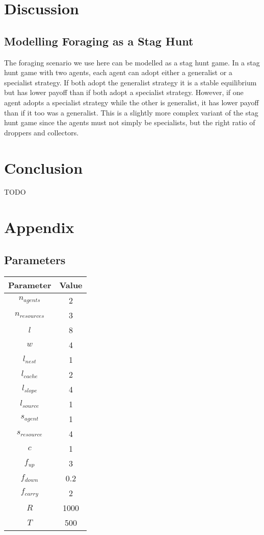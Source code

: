 \documentclass[12pt]{article}  %
\begin{document}
\section{Discussion}

\subsection{Modelling Foraging as a Stag Hunt}

The foraging scenario we use here can be modelled as a stag hunt game.
In a stag hunt game with two agents, each agent can adopt either a generalist or a specialist strategy. 
If both adopt the generalist strategy it is a stable equilibrium but has lower payoff than if both adopt a specialist strategy.
However, if one agent adopts a specialist strategy while the other is generalist, it has lower payoff than if it too was a generalist.
This is a slightly more complex variant of the stag hunt game since the agents must not simply be specialists, but the right ratio of droppers and collectors. 

\section{Conclusion}

TODO




\section{Appendix}

\subsection{Parameters}

\begin{center}
\begin{tabular}{ |c|c| } 
 \hline
 Parameter & Value  \\ 
 \hline
 \hline
 $n_{agents}$ & 2  \\ 
 \hline
 $n_{resources}$ & 3  \\ 
 \hline
 $l$ & 8  \\ 
 \hline
 $w$ & 4  \\ 
 \hline
 $l_{nest}$ & 1  \\ 
 \hline
 $l_{cache}$ & 2  \\ 
 \hline
 $l_{slope}$ & 4  \\ 
 \hline
 $l_{source}$ & 1  \\ 
 \hline
 $s_{agent}$ & 1  \\ 
 \hline
 $s_{resource}$ & 4  \\ 
 \hline
 $c$ & 1  \\ 
 \hline
 $f_{up}$ & 3  \\ 
 \hline
 $f_{down}$ & 0.2  \\ 
 \hline
 $f_{carry}$ & 2  \\ 
 \hline
 $R$ & 1000  \\ 
 \hline
 $T$ & 500  \\ 
 \hline
 
\end{tabular}
\end{center}
\end{document}

